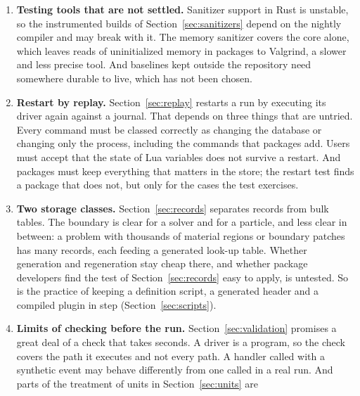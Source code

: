 \documentclass[11pt,a4paper]{article}
\begin{document}
\begin{enumerate}
        measured; generated kernels are the remedy, and they reopen the
        question of compiling for a GPU.  And the division between the core,
        which evaluates at points, and the package, which decides what
        points and how to project, has not been tested against a real
        discretization.
  \item \textbf{Testing tools that are not settled.}  Sanitizer support in
        Rust is unstable, so the instrumented builds of
        Section~\ref{sec:sanitizers} depend on the nightly compiler and may
        break with it.  The memory sanitizer covers the core alone, which
        leaves reads of uninitialized memory in packages to Valgrind, a
        slower and less precise tool.  And baselines kept outside the
        repository need somewhere durable to live, which has not been
        chosen.
  \item \textbf{Restart by replay.}  Section~\ref{sec:replay} restarts a
        run by executing its driver again against a journal.  That depends
        on three things that are untried.  Every command must be classed
        correctly as changing the database or changing only the process,
        including the commands that packages add.  Users must accept that
        the state of Lua variables does not survive a restart.  And
        packages must keep everything that matters in the store; the
        restart test finds a package that does not, but only for the cases
        the test exercises.
  \item \textbf{Two storage classes.}  Section~\ref{sec:records} separates
        records from bulk tables.  The boundary is clear for a solver and
        for a particle, and less clear in between: a problem with thousands
        of material regions or boundary patches has many records, each
        feeding a generated look-up table.  Whether generation and
        regeneration stay cheap there, and whether package developers find
        the test of Section~\ref{sec:records} easy to apply, is untested.
        So is the practice of keeping a definition script, a generated
        header and a compiled plugin in step (Section~\ref{sec:scripts}).
  \item \textbf{Limits of checking before the run.}
        Section~\ref{sec:validation} promises a great deal of a check that
        takes seconds.  A driver is a program, so the check covers the path
        it executes and not every path.  A handler called with a synthetic
        event may behave differently from one called in a real run.  And parts of the treatment of units in Section~\ref{sec:units} are

\end{enumerate}
\end{document}
